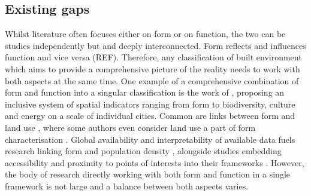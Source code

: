 \subsection{Existing gaps}
\label{sec:lit_gaps}






Whilst literature often focuses either on form or on function, the two can be studies
independently but and deeply interconnected. Form reflects and influences function and
vice versa (REF). Therefore, any classification of built environment which aims to
provide a comprehensive picture of the reality needs to work with both aspects at the
same time. One example of a comprehensive combination of form and function into a
singular classification is the work of \cite{bourdic2012}, proposing an inclusive system
of spatial indicators ranging from form to biodiversity, culture and energy on a scale
of individual cities. Common are links between form and land use
\citep{song2007,song2013,bourdic2012}, where some authors even consider land use a part
of form characterisation \citep{dibble2019origin}. Global availability and
interpretability of available data \citep{pesaresi2019ghs,sorichetta2015} fuels research
linking form and population density
\citep{ahlfeldt2019,ewing2002measuring,zheng2014urban,oecd2018rethinking}, alongside
studies embedding accessibility and proximity to points of interests into their
frameworks \citep{alexiou2016a,venerandi2019machine}. However, the body of research
directly working with both form and function in a single framework is not large and a
balance between both aspects varies.


